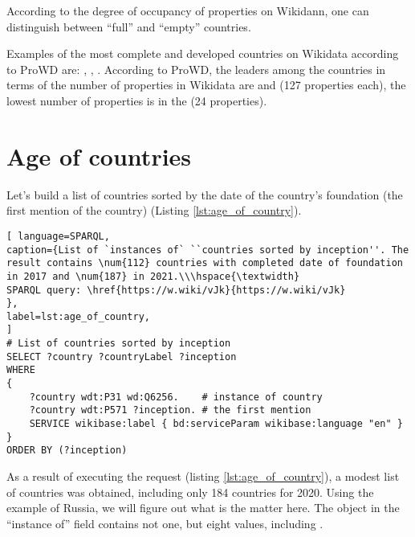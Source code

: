 According to the degree of occupancy of properties on Wikidann, one can distinguish between ``full'' and ``empty'' countries.

Examples of the most complete and developed countries on Wikidata according to ProWD are: , , . According to ProWD, the leaders among the countries in terms of the number of properties in Wikidata are  and  (127 properties each), the lowest number of properties is in the   (24 properties).


\section{Age of countries}

Let's build a list of countries sorted by the date of the country's foundation (the first mention of the country) (Listing \ref{lst:age_of_country}).

\begin{lstlisting}[ language=SPARQL, 
caption={List of `instances of` ``countries sorted by inception''. The result contains \num{112} countries with completed date of foundation in 2017 and \num{187} in 2021.\\\hspace{\textwidth}
SPARQL query: \href{https://w.wiki/vJk}{https://w.wiki/vJk}
},
label=lst:age_of_country, 					
]
# List of countries sorted by inception 
SELECT ?country ?countryLabel ?inception
WHERE
{
	?country wdt:P31 wd:Q6256.    # instance of country
	?country wdt:P571 ?inception. # the first mention
	SERVICE wikibase:label { bd:serviceParam wikibase:language "en" }
}
ORDER BY (?inception)
\end{lstlisting}

As a result of executing the request (listing \ref{lst:age_of_country}), a modest list of countries was obtained, including only 184 countries for 2020. Using the example of Russia, we will figure out what is the matter here. The  object in the ``instance of'' field contains not one, but eight values, including .



